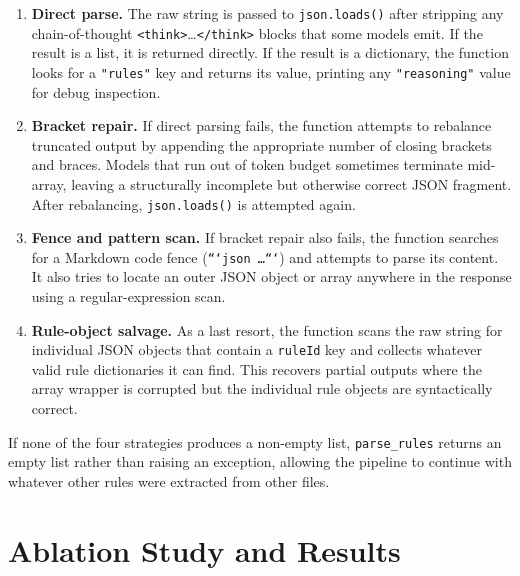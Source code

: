 ﻿\documentclass[11pt]{article}
\begin{document}
\begin{enumerate}
    \item \textbf{Direct parse.}  The raw string is passed to
          \texttt{json.loads()} after stripping any chain-of-thought
          \texttt{<think>}\ldots\texttt{</think>} blocks that some models emit.
          If the result is a list, it is returned directly.  If the result is a
          dictionary, the function looks for a \texttt{"rules"} key and returns
          its value, printing any \texttt{"reasoning"} value for debug inspection.
    \item \textbf{Bracket repair.}  If direct parsing fails, the function attempts
          to rebalance truncated output by appending the appropriate number of
          closing brackets and braces.  Models that run out of token budget
          sometimes terminate mid-array, leaving a structurally incomplete but
          otherwise correct JSON fragment.  After rebalancing, \texttt{json.loads()}
          is attempted again.
    \item \textbf{Fence and pattern scan.}  If bracket repair also fails, the
          function searches for a Markdown code fence
          (\texttt{```json \ldots ```}) and attempts to parse its content.
          It also tries to locate an outer JSON object or array anywhere in the
          response using a regular-expression scan.
    \item \textbf{Rule-object salvage.}  As a last resort, the function scans
          the raw string for individual JSON objects that contain a \texttt{ruleId}
          key and collects whatever valid rule dictionaries it can find.  This
          recovers partial outputs where the array wrapper is corrupted but the
          individual rule objects are syntactically correct.
\end{enumerate}

If none of the four strategies produces a non-empty list, \texttt{parse\_rules}
returns an empty list rather than raising an exception, allowing the pipeline to
continue with whatever other rules were extracted from other files.

\section{Ablation Study and Results}
\label{sec:ablation}
\end{document}
